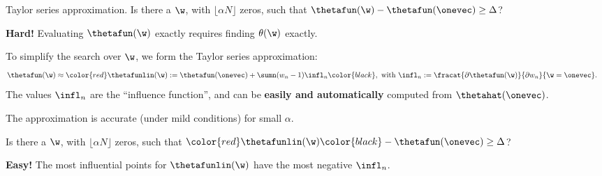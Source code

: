

\begin{frame}{Taylor series approximation.}
%
Is there a $\w$, with
$\lfloor \alpha N \rfloor$ zeros, such that
$\thetafun(\w) - \thetafun(\onevec) \ge \Delta$?

\pause
\textbf{Hard!}
Evaluating $\thetafun(\w)$ exactly requires finding $\theta(\w)$ exactly.

\pause
\hrulefill

To simplify the search over $\w$, we form the Taylor series approximation:
%
\begin{align*}
	\thetafun(\w)
		&\approx
        \color{red}
        \thetafunlin(\w)
		:= \thetafun(\onevec) +
        \sumn (w_n - 1) \infl_n
        \color{black}
        , \textrm{ with } \infl_n :=
        \fracat{\partial \thetafun(\w)}{\partial w_n}{\w = \onevec}.
\end{align*}
%
\pause
The values $\infl_n$ are the ``influence function'', and can be \textbf{easily
and automatically} computed from $\thetahat(\onevec)$.
\citep{hampel1986robustbook}

The approximation is accurate (under mild conditions) for small $\alpha$.
\citep{giordano2019higherorder}

\pause
\hrulefill

Is there a $\w$, with
$\lfloor \alpha N \rfloor$ zeros, such that
$\color{red} \thetafunlin(\w) \color{black} - \thetafun(\onevec) \ge \Delta$?

\pause
\textbf{Easy!}
The most influential points for $\thetafunlin(\w)$ have the most negative
$\infl_n$.

\end{frame}




